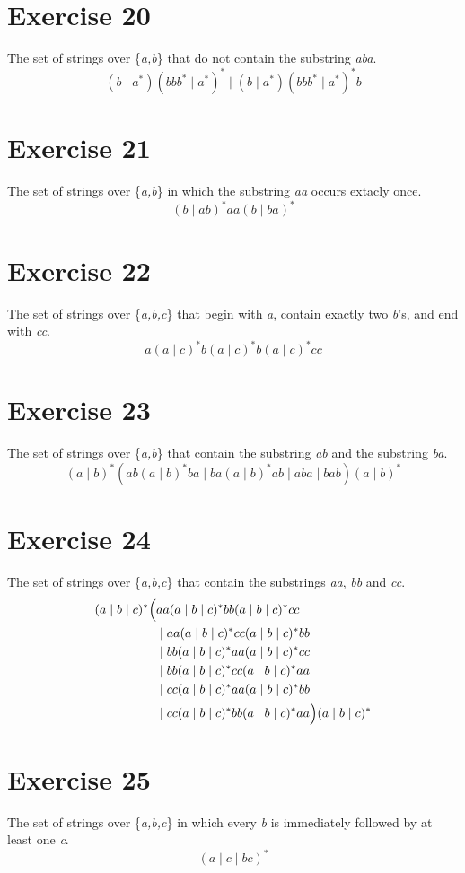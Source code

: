 \documentclass{report}
\begin{document}
\section*{Exercise 20}
The set of strings over \{\textit{a,b}\} that do not contain the substring \textit{aba}.
\newline
$$(b \mid a^*)(bbb^* \mid a^*)^* \mid (b \mid a^*)(bbb^* \mid a^*)^*b$$
\section*{Exercise 21}
The set of strings over \{\textit{a,b}\} in which the substring \textit{aa} occurs extacly once.
\newline
$$(b \mid ab)^*aa(b \mid ba)^*$$
\section*{Exercise 22}
The set of strings over \{\textit{a,b,c}\} that begin with \textit{a}, contain exactly two \textit{b}'s, and end with \textit{cc}.
\newline
$$a(a \mid c)^*b(a \mid c)^*b(a \mid c)^*cc$$
\section*{Exercise 23}
The set of strings over \{\textit{a,b}\} that contain the substring \textit{ab} and the substring \textit{ba}.
\newline
$$(a \mid b)^*(ab(a \mid b)^*ba \mid ba(a \mid b)^*ab \mid aba \mid bab)(a \mid b)^* $$
\section*{Exercise 24}
The set of strings over \{\textit{a,b,c}\} that contain the substrings \textit{aa}, \textit{bb} and \textit{cc}.
\[
\begin{aligned}
(a\mid b\mid c)^*\Bigl(
  & aa(a\mid b\mid c)^*bb(a\mid b\mid c)^*cc \\
  & {}\mid aa(a\mid b\mid c)^*cc(a\mid b\mid c)^*bb \\
  & {}\mid bb(a\mid b\mid c)^*aa(a\mid b\mid c)^*cc \\
  & {}\mid bb(a\mid b\mid c)^*cc(a\mid b\mid c)^*aa \\
  & {}\mid cc(a\mid b\mid c)^*aa(a\mid b\mid c)^*bb \\
  & {}\mid cc(a\mid b\mid c)^*bb(a\mid b\mid c)^*aa
\Bigr)(a\mid b\mid c)^*
\end{aligned}
\]
\section*{Exercise 25}
The set of strings over \{\textit{a,b,c}\} in which every \textit{b} is immediately followed by at least one \textit{c}.
\newline
$$(a \mid c \mid bc)^*$$
\end{document}
